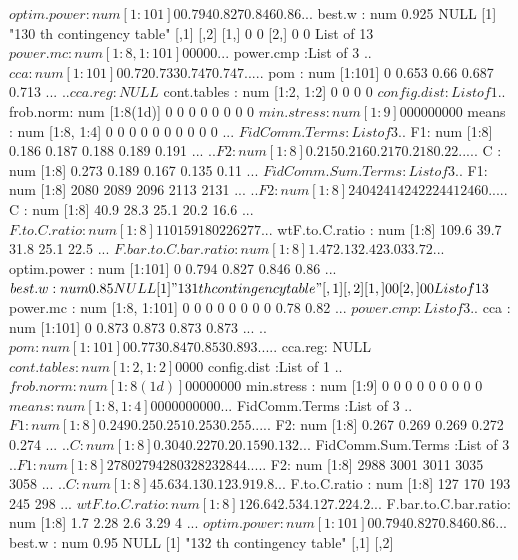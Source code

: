 \documentclass[11pt]{article} %
\begin{document}
\begin{Schunk}
\begin{Soutput}
 $ optim.power         : num [1:101] 0 0.794 0.827 0.846 0.86 ...
 $ best.w              : num 0.925
NULL
[1] "130 th contingency table"
     [,1] [,2]
[1,]    0    0
[2,]    0    0
List of 13
 $ power.mc            : num [1:8, 1:101] 0 0 0 0 0 ...
 $ power.cmp           :List of 3
  ..$ cca    : num [1:101] 0 0.72 0.733 0.747 0.747 ...
  ..$ pom    : num [1:101] 0 0.653 0.66 0.687 0.713 ...
  ..$ cca.reg: NULL
 $ cont.tables         : num [1:2, 1:2] 0 0 0 0
 $ config.dist         :List of 1
  ..$ frob.norm: num [1:8(1d)] 0 0 0 0 0 0 0 0
 $ min.stress          : num [1:9] 0 0 0 0 0 0 0 0 0
 $ means               : num [1:8, 1:4] 0 0 0 0 0 0 0 0 0 0 ...
 $ FidComm.Terms       :List of 3
  ..$ F1: num [1:8] 0.186 0.187 0.188 0.189 0.191 ...
  ..$ F2: num [1:8] 0.215 0.216 0.217 0.218 0.22 ...
  ..$ C : num [1:8] 0.273 0.189 0.167 0.135 0.11 ...
 $ FidComm.Sum.Terms   :List of 3
  ..$ F1: num [1:8] 2080 2089 2096 2113 2131 ...
  ..$ F2: num [1:8] 2404 2414 2422 2441 2460 ...
  ..$ C : num [1:8] 40.9 28.3 25.1 20.2 16.6 ...
 $ F.to.C.ratio        : num [1:8] 110 159 180 226 277 ...
 $ wtF.to.C.ratio      : num [1:8] 109.6 39.7 31.8 25.1 22.5 ...
 $ F.bar.to.C.bar.ratio: num [1:8] 1.47 2.13 2.42 3.03 3.72 ...
 $ optim.power         : num [1:101] 0 0.794 0.827 0.846 0.86 ...
 $ best.w              : num 0.85
NULL
[1] "131 th contingency table"
     [,1] [,2]
[1,]    0    0
[2,]    0    0
List of 13
 $ power.mc            : num [1:8, 1:101] 0 0 0 0 0 0 0 0 0.78 0.82 ...
 $ power.cmp           :List of 3
  ..$ cca    : num [1:101] 0 0.873 0.873 0.873 0.873 ...
  ..$ pom    : num [1:101] 0 0.773 0.847 0.853 0.893 ...
  ..$ cca.reg: NULL
 $ cont.tables         : num [1:2, 1:2] 0 0 0 0
 $ config.dist         :List of 1
  ..$ frob.norm: num [1:8(1d)] 0 0 0 0 0 0 0 0
 $ min.stress          : num [1:9] 0 0 0 0 0 0 0 0 0
 $ means               : num [1:8, 1:4] 0 0 0 0 0 0 0 0 0 0 ...
 $ FidComm.Terms       :List of 3
  ..$ F1: num [1:8] 0.249 0.25 0.251 0.253 0.255 ...
  ..$ F2: num [1:8] 0.267 0.269 0.269 0.272 0.274 ...
  ..$ C : num [1:8] 0.304 0.227 0.2 0.159 0.132 ...
 $ FidComm.Sum.Terms   :List of 3
  ..$ F1: num [1:8] 2780 2794 2803 2823 2844 ...
  ..$ F2: num [1:8] 2988 3001 3011 3035 3058 ...
  ..$ C : num [1:8] 45.6 34.1 30.1 23.9 19.8 ...
 $ F.to.C.ratio        : num [1:8] 127 170 193 245 298 ...
 $ wtF.to.C.ratio      : num [1:8] 126.6 42.5 34.1 27.2 24.2 ...
 $ F.bar.to.C.bar.ratio: num [1:8] 1.7 2.28 2.6 3.29 4 ...
 $ optim.power         : num [1:101] 0 0.794 0.827 0.846 0.86 ...
 $ best.w              : num 0.95
NULL
[1] "132 th contingency table"
     [,1] [,2]

\end{Soutput}
\end{Schunk}
\end{document}
